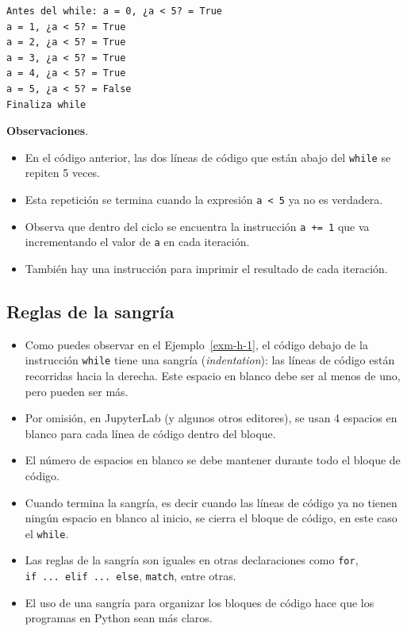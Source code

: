 \documentclass[
  spanish,
  letterpaper,
]{scrbook}
\providecommand{\tightlist}{%
  \setlength{\itemsep}{0pt}\setlength{\parskip}{0pt}}
\theoremstyle{definition}
\theoremstyle{remark}
\begin{document}
\begin{verbatim}
Antes del while: a = 0, ¿a < 5? = True
a = 1, ¿a < 5? = True
a = 2, ¿a < 5? = True
a = 3, ¿a < 5? = True
a = 4, ¿a < 5? = True
a = 5, ¿a < 5? = False
Finaliza while
\end{verbatim}

\textbf{Observaciones}.

\begin{itemize}
\tightlist
\item
  En el código anterior, las dos líneas de código que están abajo del
  \texttt{while} se repiten 5 veces.
\item
  Esta repetición se termina cuando la expresión
  \texttt{a\ \textless{}\ 5} ya no es verdadera.
\item
  Observa que dentro del ciclo se encuentra la instrucción
  \texttt{a\ +=\ 1} que va incrementando el valor de \texttt{a} en cada
  iteración.
\item
  También hay una instrucción para imprimir el resultado de cada
  iteración.
\end{itemize}

\subsection{Reglas de la sangría}\label{reglas-de-la-sangruxeda}

\begin{itemize}
\tightlist
\item
  Como puedes observar en el Ejemplo~\ref{exm-h-1}, el código debajo de
  la instrucción \texttt{while} tiene una sangría (\emph{indentation}):
  las líneas de código están recorridas hacia la derecha. Este espacio
  en blanco debe ser al menos de uno, pero pueden ser más.
\item
  Por omisión, en JupyterLab (y algunos otros editores), se usan 4
  espacios en blanco para cada línea de código dentro del bloque.
\item
  El número de espacios en blanco se debe mantener durante todo el
  bloque de código.
\item
  Cuando termina la sangría, es decir cuando las líneas de código ya no
  tienen ningún espacio en blanco al inicio, se cierra el bloque de
  código, en este caso el \texttt{while}.
\item
  Las reglas de la sangría son iguales en otras declaraciones como
  \texttt{for}, \texttt{if\ ...\ elif\ ...\ else}, \texttt{match}, entre
  otras.
\item
  El uso de una sangría para organizar los bloques de código hace que
  los programas en Python sean más claros.
\end{itemize}
\end{document}
